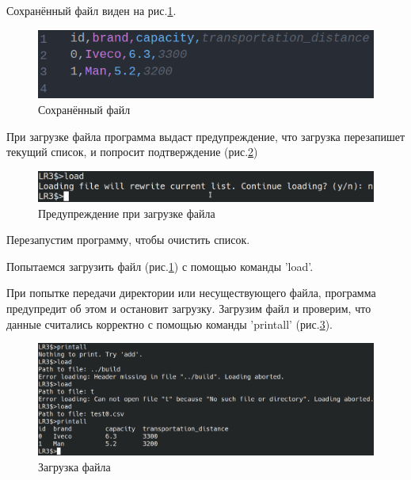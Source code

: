 Сохранённый файл виден на рис.\ref{test.file}.

\begin{figure}[hpt!]
    \centering
    \includegraphics[width=0.9\linewidth]{photo/test.file}
    \caption{Сохранённый файл}
    \label{test.file}
\end{figure}

При загрузке файла программа выдаст предупреждение, что 
загрузка перезапишет текущий список, и попросит подтверждение (рис.\ref{test.load.exist})

\begin{figure}[hpt!]
    \centering
    \includegraphics[width=0.9\linewidth]{photo/test.load.exist}
    \caption{Предупреждение при загрузке файла}
    \label{test.load.exist}
\end{figure}

Перезапустим программу, чтобы очистить список.

Попытаемся загрузить файл (рис.\ref{test.file}) с помощью команды 'load'.

При попытке передачи директории или несуществующего файла, 
программа предупредит об этом и остановит загрузку.
Загрузим файл и проверим, что данные считались корректно 
с помощью команды 'printall' (рис.\ref{test.load}).

\begin{figure}[hpt!]
    \centering
    \includegraphics[width=0.9\linewidth]{photo/test.load}
    \caption{Загрузка файла}
    \label{test.load}
\end{figure}